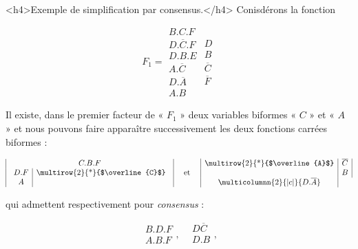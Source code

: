 <h4>Exemple de simplification par consensus.</h4> Conisdérons la fonction 

\[ F_1 = \begin{array}{|l|} B . C . F \\
                            D . \overline{C} . F \\
                            D . B . E \\
                            A . \overline{C} \\
                            D . \overline{A}\\
                            A . B \end{array} \begin{array}{c|} D \\ B \\ \overline{C} \\ \overline{F}\end{array} 
\]

Il existe, dans le premier facteur de  « $F_1$ » deux variables biformes « $C$ » et « $A$ » et nous pouvons faire apparaître successivement les deux fonctions carrées biformes : 

\[  \begin{array}{|c|} C . B . F \\
           \begin{array}{c|c} D . F & $\multirow{2}{*}{$\overline{C}$}$\\
                                  A & \\            \end{array} 
\end{array}                             
                    \quad   \text { et } \quad 
              \begin{array}{|c|c|} 
             $\multirow{2}{*}{$\overline{A}$}$ & \overline{C} \\
                          & B \\
\multicolumnn{2}{|c|}{D . \overline{A} }  \\          
              \end{array} 
\] 

qui admettent respectivement pour \emph{consensus} : 

\[ \begin{array}{|c|} B . D . F \\ A . B . F \end{array} \text{,} \quad \begin{array}{|c|} D \overline{C} \\ D . B \\ \end{array} \text{,} \]  



